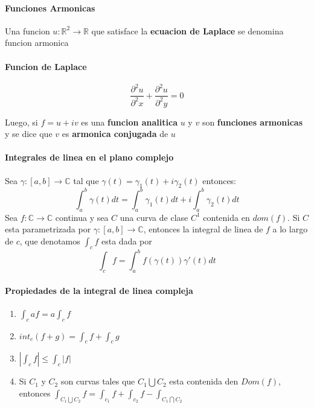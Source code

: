 \documentclass[10pt]{article}
\begin{document}
\paragraph{Funciones Armonicas}
Una funcion $u:\mathbb{R}^2 \rightarrow \mathbb{R}$ que satisface la \textbf{ecuacion de Laplace} se denomina funcion armonica
\paragraph{Funcion de Laplace}
\begin{equation*}
	\dfrac{\partial^2 u}{\partial^2 x} + \dfrac{\partial^2 u}{\partial^2 y}  =0
\end{equation*}

Luego, si $f = u+iv$ es una \textbf{funcion analitica} $u$ y $v$ son \textbf{funciones armonicas} y se dice que $v$ es \textbf{armonica conjugada} de $u$

\paragraph{Integrales de linea en el plano complejo}

Sea $\gamma : [a,b] \rightarrow \mathbb{C}$ tal que $\gamma (t) = \gamma_1 (t) + i\gamma_2 (t)$ entonces:
\begin{equation*}
	\int_a^b \gamma (t)dt = \int_a^b \gamma_1 (t)dt + i\int_a^b \gamma_2 (t) dt
\end{equation*}
Sea $f: \mathbb{C}\rightarrow \mathbb{C}$ continua y sea $C$ una curva de clase $C^1$ contenida en $dom(f)$. Si $C$ esta parametrizada por $\gamma : [a,b] \rightarrow \mathbb{C}$, entonces la integral de linea de $f$ a lo largo de $c$, que denotamos $\int_c f$ esta dada por
\begin{equation*}
	\int_c f = \int_a^b f(\gamma(t))\gamma'(t)dt
\end{equation*}
\paragraph{Propiedades de la integral de linea compleja}
\begin{enumerate}
	\item $\int_c af = a\int_c f$
	\item $int_c (f+g) = \int_c f + \int_c g$
	\item $|\int_c f| \leq \int_c |f|$
	\item Si $C_1$ y $C_2$ son curvas tales que $C_1 \bigcup C_2$ esta contenida den $Dom(f)$, entonces
	$\int_{C_1 \bigcup C_2} f = \int_{c_1}f + \int_{c_2}f - \int_{C_1 \bigcap C_2}$
\end{enumerate}
\end{document}
